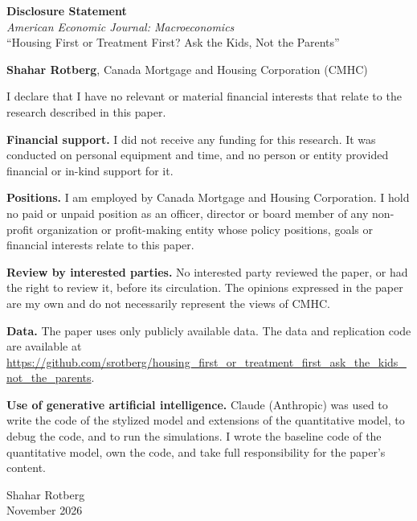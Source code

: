 \documentclass[12pt]{article}
\begin{document}
\begin{center}
{\large\bfseries Disclosure Statement}\\[0.6em]
\textit{American Economic Journal: Macroeconomics}\\[0.3em]
``Housing First or Treatment First? Ask the Kids, Not the Parents''
\end{center}
\vspace{0.8em}

\textbf{Shahar Rotberg}, Canada Mortgage and Housing Corporation (CMHC)

I declare that I have no relevant or material financial interests that relate to the research described in this paper.

\textbf{Financial support.} I did not receive any funding for this research. It was conducted on personal equipment and time, and no person or entity provided financial or in-kind support for it.

\textbf{Positions.} I am employed by Canada Mortgage and Housing Corporation. I hold no paid or unpaid position as an officer, director or board member of any non-profit organization or profit-making entity whose policy positions, goals or financial interests relate to this paper.

\textbf{Review by interested parties.} No interested party reviewed the paper, or had the right to review it, before its circulation. The opinions expressed in the paper are my own and do not necessarily represent the views of CMHC.

\textbf{Data.} The paper uses only publicly available data. The data and replication code are available at \url{https://github.com/srotberg/housing_first_or_treatment_first_ask_the_kids_not_the_parents}.

\textbf{Use of generative artificial intelligence.} Claude (Anthropic) was used to write the code of the stylized model and extensions of the quantitative model, to debug the code, and to run the simulations. I wrote the baseline code of the quantitative model, own the code, and take full responsibility for the paper's content.

\vspace{2em}
Shahar Rotberg\\
November 2026
\end{document}
